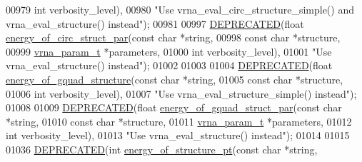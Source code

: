 \begin{DoxyCode}
00979                                           \textcolor{keywordtype}{int}         verbosity\_level),
00980            \textcolor{stringliteral}{"Use vrna\_eval\_circ\_structure\_simple() and vrna\_eval\_structure() instead"});
00981 
00997 \mbox{\hyperlink{eval_8h_aab347a3c03fbe8e7319551b9fa0cce4a}{DEPRECATED}}(\textcolor{keywordtype}{float} \mbox{\hyperlink{group__eval_ga3f01f9744ba6a40555eb4d81fc77f6df}{energy\_of\_circ\_struct\_par}}(\textcolor{keyword}{const} \textcolor{keywordtype}{char}   *\textcolor{keywordtype}{string},
00998                                            \textcolor{keyword}{const} \textcolor{keywordtype}{char}   *structure,
00999                                            \mbox{\hyperlink{group__energy__parameters_structvrna__param__s}{vrna\_param\_t}} *parameters,
01000                                            \textcolor{keywordtype}{int}          verbosity\_level),
01001            \textcolor{stringliteral}{"Use vrna\_eval\_structure() instead"});
01002 
01003 
01004 \mbox{\hyperlink{eval_8h_aab347a3c03fbe8e7319551b9fa0cce4a}{DEPRECATED}}(\textcolor{keywordtype}{float} \mbox{\hyperlink{group__eval_ga30687ad32835b9894875940958e3eb9a}{energy\_of\_gquad\_structure}}(\textcolor{keyword}{const} \textcolor{keywordtype}{char} *\textcolor{keywordtype}{string},
01005                                            \textcolor{keyword}{const} \textcolor{keywordtype}{char} *structure,
01006                                            \textcolor{keywordtype}{int}        verbosity\_level),
01007            \textcolor{stringliteral}{"Use vrna\_eval\_structure\_simple() instead"});
01008 
01009 \mbox{\hyperlink{eval_8h_aab347a3c03fbe8e7319551b9fa0cce4a}{DEPRECATED}}(\textcolor{keywordtype}{float} \mbox{\hyperlink{group__eval_ga7d8e18eab7bdc45744b063c81a25ca78}{energy\_of\_gquad\_struct\_par}}(\textcolor{keyword}{const} \textcolor{keywordtype}{char}    *\textcolor{keywordtype}{string},
01010                                             \textcolor{keyword}{const} \textcolor{keywordtype}{char}    *structure,
01011                                             \mbox{\hyperlink{group__energy__parameters_structvrna__param__s}{vrna\_param\_t}}  *parameters,
01012                                             \textcolor{keywordtype}{int}           verbosity\_level),
01013            \textcolor{stringliteral}{"Use vrna\_eval\_structure() instead"});
01014 
01015 
01036 \mbox{\hyperlink{eval_8h_aab347a3c03fbe8e7319551b9fa0cce4a}{DEPRECATED}}(\textcolor{keywordtype}{int} \mbox{\hyperlink{group__eval_ga8831445966b761417e713360791299d8}{energy\_of\_structure\_pt}}(\textcolor{keyword}{const} \textcolor{keywordtype}{char}  *\textcolor{keywordtype}{string},

\end{DoxyCode}
